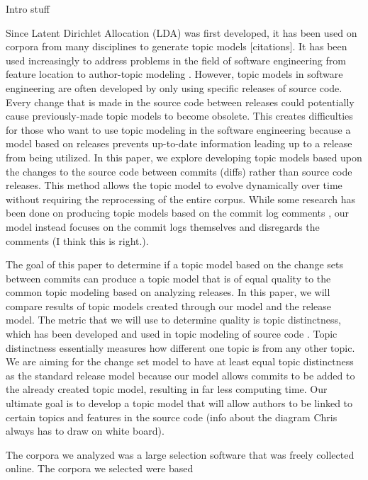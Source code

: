 
Intro stuff \cite{Blei2003}

Since Latent Dirichlet Allocation (LDA) \cite{Blei2003} was first developed, it has been used on corpora from many disciplines to generate topic models [citations]. It has been used increasingly to address problems in the field of software engineering \cite{Binkley2014} from feature location \cite{Bassett2013} to author-topic modeling \cite{Steyvers2004}. However, topic models in software engineering are often developed by only using specific releases of source code. Every change that is made in the source code between releases could potentially cause previously-made topic models to become obsolete. This creates difficulties for those who want to use topic modeling in the software engineering because a model based on releases prevents up-to-date information leading up to a release from being utilized. In this paper, we explore developing topic models based upon the changes to the source code between commits (diffs) \cite{Thomas2011} rather than source code releases. This method allows the topic model to evolve dynamically over time without requiring the reprocessing of the entire corpus. While some research has been done on producing topic models based on the commit log comments \cite{Hindle2009}, our model instead focuses on the commit logs themselves and disregards the comments (I think this is right.).

The goal of this paper to determine if a topic model based on the change sets between commits can produce a topic model that is of equal quality to the common topic modeling based on analyzing releases. In this paper, we will compare results of topic models created through our model and the release model. The metric that we will use to determine quality is topic distinctness, which has been developed and used in topic modeling of source code \cite{Thomas2011}. Topic distinctness essentially measures how different one topic is from any other topic. We are aiming for the change set model to have at least equal topic distinctness as the standard release model because our model allows commits to be added to the already created topic model, resulting in far less computing time. Our ultimate goal is to develop a topic model that will allow authors to be linked to certain topics and features in the source code (info about the diagram Chris always has to draw on white board).

The corpora we analyzed was a large selection software that was freely collected online. The corpora we selected were based



